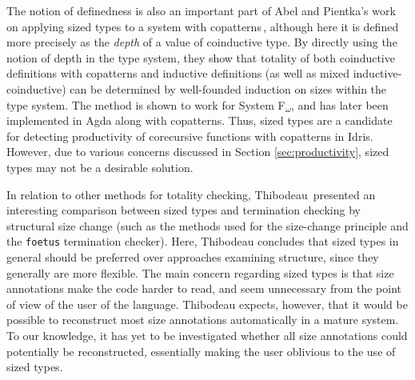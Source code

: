 The notion of definedness is also an important part of Abel and Pientka's work on applying sized types to a system with copatterns\,\citep{Abel13Wellfounded}, although here it is defined more precisely as the \emph{depth} of a value of coinductive type. By directly using the notion of depth in the type system, they show that totality of both coinductive definitions with copatterns and inductive definitions (as well as mixed inductive-coinductive) can be determined by well-founded induction on sizes within the type system. The method is shown to work for System F\textsubscript{$\omega$}, and has later been implemented in Agda along with copatterns. Thus, sized types are a candidate for detecting productivity of corecursive functions with copatterns in Idris. However, due to various concerns discussed in Section \ref{sec:productivity}, sized types may not be a desirable solution.

In relation to other methods for totality checking, Thibodeau\,\citep{Thibodeau11} presented an interesting comparison between sized types and termination checking by structural size change (such as the methods used for the size-change principle and the \texttt{foetus} termination checker). Here, Thibodeau concludes that sized types in general should be preferred over approaches examining structure, since they generally are more flexible. The main concern regarding sized types is that size annotations make the code harder to read, and seem unnecessary from the point of view of the user of the language. Thibodeau expects, however, that it would be possible to reconstruct most size annotations automatically in a mature system. To our knowledge, it has yet to be investigated whether all size annotations could potentially be reconstructed, essentially making the user oblivious to the use of sized types.

